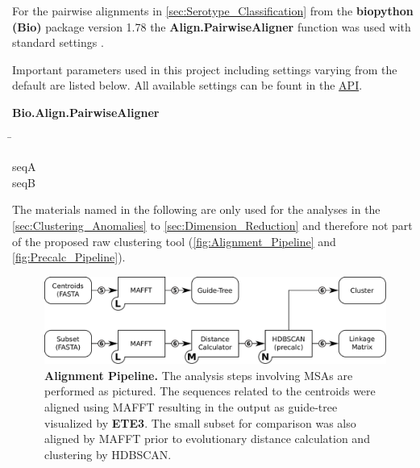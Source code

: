 For the pairwise alignments in \autoref{sec:Serotype_Classification} from the \textbf{biopython (Bio)} package version 1.78 the \textbf{Align.PairwiseAligner} function was used with standard settings \autocite{cock_biopython_2009}. 

Important parameters used in this project including settings varying from the default are listed below. All available settings can be fount in the \href{https://biopython.org/docs/1.75/api/Bio.Align.html}{API}.

\begin{leftbar}
    \textbf{Bio.Align.PairwiseAligner}
    \begin{nstabbing}
        \qquad\qquad\qquad\qquad\qquad\quad\=\kill
    
         seqA \\ 
         
         seqB 
        
    \end{nstabbing}
\end{leftbar}

The materials named in the following are only used for the analyses in the \autoref{sec:Clustering_Anomalies} to \autoref{sec:Dimension_Reduction} and therefore not part of the proposed raw clustering tool (\autoref{fig:Alignment_Pipeline} and \autoref{fig:Precalc_Pipeline}).

\begin{figure}[!hbt]
    \centering
    \includegraphics[width=\textwidth]{Graphics/Alignment.pdf}
    \caption[Alignment Pipeline]{\textbf{Alignment Pipeline.} The analysis steps involving \glspl{MSA} are performed as pictured. The sequences related to the centroids were aligned using MAFFT resulting in the output as guide-tree visualized by \textbf{ETE3}. The small subset for comparison was also aligned by MAFFT prior to evolutionary distance calculation and clustering by \gls{HDBSCAN}.}
    \label{fig:Alignment_Pipeline}
\end{figure}

